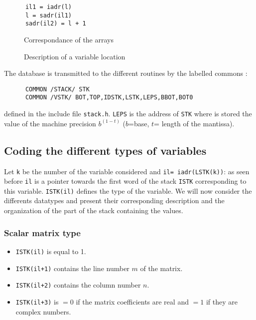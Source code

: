 \begin{verbatim}
      il1 = iadr(l)
      l = sadr(il1)
      sadr(il2) = l + 1
\end{verbatim}


\begin{figure}
\hspace{-1.cm}
\caption{Correspondance of the arrays}
\label{stack2}
\end{figure}


\begin{figure}
\hspace{-1.cm}
\caption{Description of a variable location}
\label{stack3}
\end{figure}


The database is transmitted to the different routines by the labelled commons :

\begin{verbatim}
      COMMON /STACK/ STK
      COMMON /VSTK/ BOT,TOP,IDSTK,LSTK,LEPS,BBOT,BOT0
\end{verbatim}
defined in the include file  {\tt stack.h}.
{\tt LEPS} is the address of {\tt STK} where is stored the value of the 
machine precision  $b^{(1-t)}$   ($b$=base, $t$= length of the mantissa).

\subsection{Coding the different types of variables}
Let {\tt  k} be the number of the variable  considered  and {\tt  il=
iadr(LSTK(k))}: as seen before {\tt il}  is a pointer  towards the first word 
of the stack
\verb!ISTK!  corresponding to this variable.  \verb!ISTK(il)!  defines the type
of the variable. We will now consider the differents datatypes and present
their corresponding description and the organization of the part of the stack 
containing the values.


\subsubsection{Scalar matrix type}

\begin{itemize}

\item {\tt ISTK(il)} is equal to 1.

\item {\tt ISTK(il+1)} contains the line number $m$ of the matrix.

\item{\tt ISTK(il+2)} contains the column number $n$.

\item {\tt ISTK(il+3)} is $=0$ if the matrix coefficients are real and
$=1$ if they are complex numbers.

\end{itemize}

